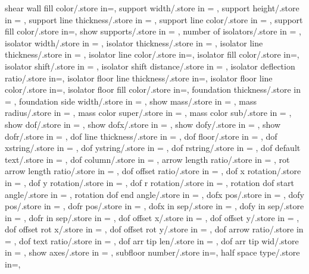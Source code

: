 {shear wall fill color/.store in=\shearwallfillcolor,
support width/.store in = \supportwidth,
support height/.store in = \supportheight,
support line thickness/.store in = \baselinet,
support line color/.store in = \supportlinecolor,
support fill color/.store in=\supportfillcolor,
show supports/.store in = \showsupports,
number of isolators/.store in = \numberofisolators,
isolator width/.store in = \isolationwidth,
isolator thickness/.store in = \isolationdepth,
isolator line thickness/.store in = \isolinet,
isolator line color/.store in=\isolinecolor,
isolator fill color/.store in=\isofillcolor,
isolator shift/.store in = \isoshiftyn,
isolator shift distance/.store in = \isoshift,
isolator deflection ratio/.store in=\isodeflratio,
isolator floor line thickness/.store in=\isofloorlinethk,
isolator floor line color/.store in=\isofloorlinecolor,
isolator floor fill color/.store in=\isofloorfillcolor,
foundation thickness/.store in = \foundationdepth,
foundation side width/.store in = \foundsidew,
show mass/.store in = \showmass,
mass radius/.store in = \massrad,
mass color super/.store in = \masscolorsuper,
mass color sub/.store in = \masscolorsub,
show dof/.store in = \showdof,
show dofx/.store in = \shodofx,
show dofy/.store in = \shodofy,
show dofr/.store in = \shodofr,
dof line thickness/.store in = \doflinethickness,
dof floor/.store in = \doflocfloor,
dof xstring/.store in = \dofxstr,
dof ystring/.store in = \dofystr,
dof rstring/.store in = \dofrstr,
dof default text/.store in = \dofdefaulttext,
dof column/.store in = \dofloccolumn,
arrow length ratio/.store in = \arrowlenratio,
rot arrow length ratio/.store in = \rotarrowlenratio,
dof offset ratio/.store in = \dofoffsetratio,
dof x rotation/.store in = \dofxrotation,
dof y rotation/.store in = \dofyrotation,
dof r rotation/.store in = \dofrrotation,
rotation dof start angle/.store in = \rotdofstartangle,
rotation dof end angle/.store in = \rotdofendangle,
dofx pos/.store in = \dofposx,
dofy pos/.store in = \dofposy,
dofr pos/.store in = \dofposr,
dofx in sep/.store in = \dofinnersepx,
dofy in sep/.store in = \dofinnersepy,
dofr in sep/.store in = \dofinnersepr,
dof offset x/.store in = \dofoffsetx,
dof offset y/.store in = \dofoffsety,
dof offset rot x/.store in = \dofrotoffsetx,
dof offset rot y/.store in = \dofrotoffsety,
dof arrow ratio/.store in = \dofarrowratio,
dof text ratio/.store in = \doftextratio,
dof arr tip len/.store in = \dofarrtiplen,
dof arr tip wid/.store in = \dofarrtipwid,
show axes/.store in = \showaxes,
subfloor number/.store in=\subfloors,
half space type/.store in=\halfspacetype,
}
